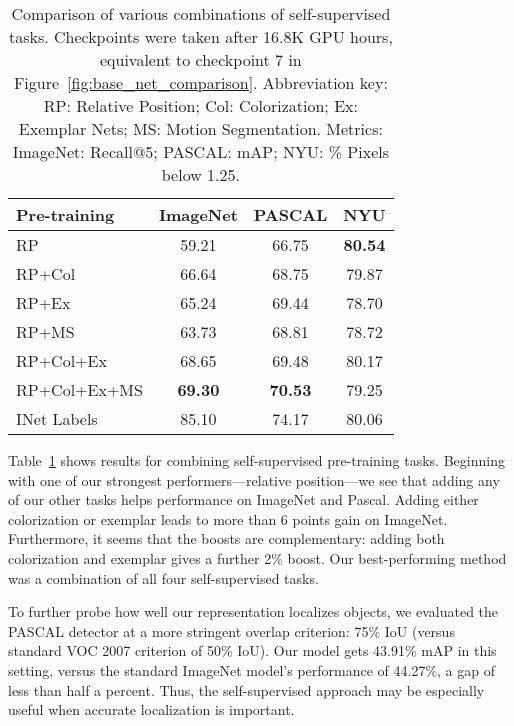\documentclass[10pt,twocolumn,letterpaper]{article}
\begin{document}
\begin{table}

\begin{center}
\begin{tabular}{l|c|c|c}
\hline
Pre-training & ImageNet & PASCAL & NYU\\
\hline\hline
RP & 59.21 & 66.75 & \textbf{80.54} \\
\hline
RP+Col  & 66.64 & 68.75 & 79.87\\
\hline
RP+Ex & 65.24 & 69.44 & 78.70\\
\hline
RP+MS & 63.73 & 68.81 & 78.72\\
\hline
RP+Col+Ex & 68.65 & 69.48 & 80.17\\
\hline
RP+Col+Ex+MS & \textbf{69.30} & \textbf{70.53} & 79.25\\
\hline
\hline
INet Labels & 85.10 & 74.17 & 80.06\\
\hline
\end{tabular}
\end{center}

\caption{Comparison of various combinations of self-supervised tasks.  Checkpoints were taken after 16.8K GPU hours, equivalent to checkpoint 7 in Figure~\ref{fig:base_net_comparison}.  Abbreviation key: RP: Relative Position; Col: Colorization; Ex: Exemplar Nets; MS: Motion Segmentation.  Metrics: ImageNet: Recall@5; PASCAL: mAP; NYU: \% Pixels below 1.25.}

\label{tab:combination}
\end{table}

Table~\ref{tab:combination} shows results for combining self-supervised pre-training tasks.
Beginning with one of our strongest performers---relative position---we see that adding any of our other tasks helps performance on ImageNet and Pascal.  
Adding either colorization or exemplar leads to more than 6 points gain on ImageNet.
Furthermore, it seems that the boosts are complementary: adding both colorization and exemplar gives a further 2\% boost.  
Our best-performing method was a combination of all four self-supervised tasks.  


To further probe how well our representation localizes objects, we
evaluated the PASCAL detector at a more stringent overlap criterion:
75\% IoU (versus standard VOC 2007 criterion of 50\% IoU).  Our model
gets 43.91\% mAP in this setting, versus the standard ImageNet model's
performance of 44.27\%, a gap of less than half a percent.  Thus, the
self-supervised approach may be especially useful when accurate
localization is important.
\end{document}
